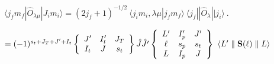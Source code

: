 \documentclass[11pt]{article}
\def\lthtmlcheckvsize{\ifdim\ht\sizebox<\vsize 
  \ifdim\wd\sizebox<\hsize\expandafter\hfill\fi \expandafter\vfill
  \else\expandafter\vss\fi}%
\begin{document}
{\newpage\clearpage
{}%
$\displaystyle \langle j_f m_f | \hat{O}_{\lambda \mu} | J_i m_i \rangle
 = (2j_f+1)^{-1/2} ~ \langle j_i m_i ,\lambda \mu | j_f m_f \rangle ~
\langle j_f || \hat{O}_\lambda || j_i\rangle \ .
$%
\lthtmlindisplaymathZ
\lthtmlcheckvsize\clearpage}

{\newpage\clearpage
{}%
$\textstyle =  (-1)^{s_t+J_T+J'+I_t}
\left\{ \begin{array}{ccc}
J'  & I_t' & J_T \\
I_t & J    & s_t \\
\end{array} \right\}   \hat{J} \hat{J'}
\left\{ \begin{array}{ccc}
L' & I_p' & J'  \\
\ell & s_p & s_t  \\
L & I_p & J  \\
\end{array} \right\}  ~   \langle L' \parallel {\bf S}(\ell)  \parallel L \rangle$%
\lthtmlindisplaymathZ
\lthtmlcheckvsize\clearpage}
\end{document}
